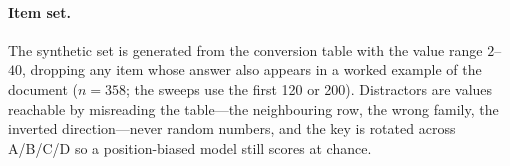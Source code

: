 \documentclass{article}
\begin{document}
\paragraph{Item set.} The synthetic set is generated from the conversion table
with the value range $2$--$40$, dropping any item whose answer also appears in a
worked example of the document ($n=358$; the sweeps use the first 120 or 200).
Distractors are values reachable by misreading the table---the neighbouring row,
the wrong family, the inverted direction---never random numbers, and the key is
rotated across A/B/C/D so a position-biased model still scores at chance.
\end{document}
